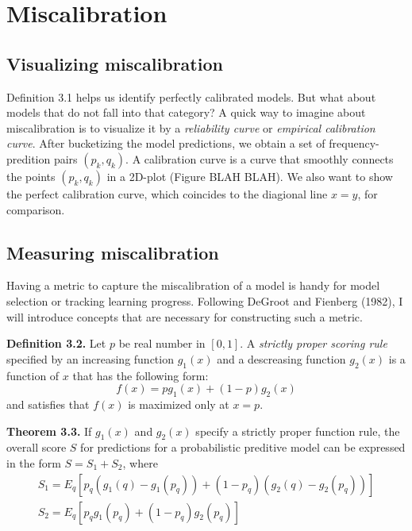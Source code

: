 \section{Miscalibration}

\subsection{Visualizing miscalibration}

Definition 3.1 helps us identify perfectly calibrated models. But what about models that do not fall into that category? A quick way to imagine about miscalibration is to visualize it by a \textit{reliability curve} or \textit{empirical calibration curve}. After bucketizing the model predictions, we obtain a set of frequency-predition pairs $(p_k, q_k)$. A calibration curve is a curve that smoothly connects the points $(p_k, q_k)$ in a 2D-plot (Figure BLAH BLAH). We also want to show the perfect calibration curve, which coincides to the diagional line $x=y$, for comparison. 

\subsection{Measuring miscalibration}

Having a metric to capture the miscalibration of a model is handy for model selection or tracking learning progress. Following DeGroot and Fienberg (1982), I will introduce concepts that are necessary for constructing such a metric.

\textbf{Definition 3.2.} Let $p$ be real number in $[0, 1]$. A \textit{strictly proper scoring rule} specified by an increasing function $g_1(x)$ and a descreasing function $g_2(x)$ is a function of $x$ that has the following form:
\begin{equation}
    \displaystyle f(x) = pg_1(x) + (1 - p)g_2(x)
    \label{eqn:proper_rule}
\end{equation}
and satisfies that $f(x)$ is maximized only at $x = p$.

\textbf{Theorem 3.3.} If $g_1(x)$ and $g_2(x)$ specify a strictly proper function rule, the overall score $S$ for predictions for a probabilistic preditive model can be expressed in the form $S = S_1 + S_2$, where
\begin{equation}    
  \begin{array}{l}
    S_1 = E_{q}[p_q(g_1(q) - g_1(p_q)) + (1 - p_q)(g_2(q) - g_2(p_q))] \\ 
    S_2 = E_{q}[p_qg_1(p_q) + (1 - p_q)g_2(p_q)]
  \end{array}
  \label{eqn:general_metric}
\end{equation}

